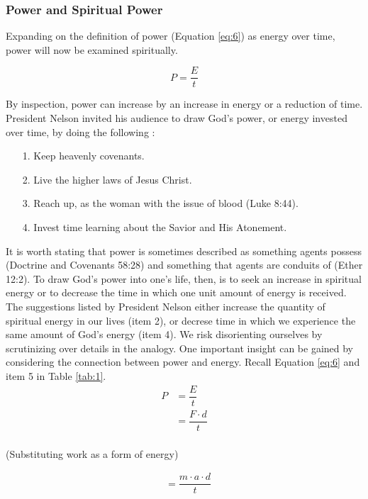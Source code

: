\documentclass{article}
\begin{document}
            \subsubsection{Power and Spiritual Power}
                Expanding on the definition of power (Equation \ref{eq:6}) as energy over time, power will now be examined spiritually.
                
                \[P = \dfrac{E}{t}\]

                By inspection, power can increase by an increase in energy or a reduction of time. President Nelson invited his audience to draw God's power, or energy invested over time, by doing the following \cite{Nelson2}:

                \begin{enumerate}
                    \item[1.] Keep heavenly covenants.
                    \item[2.] Live the higher laws of Jesus Christ.
                    \item[3.] Reach up, as the woman with the issue of blood (Luke 8:44).
                    \item[4.] Invest time learning about the Savior and His Atonement.
                \end{enumerate}

                It is worth stating that power is sometimes described as something agents possess (Doctrine and Covenants 58:28) and something that agents are conduits of (Ether 12:2). 
                To draw God's power into one's life, then, is to seek an increase in spiritual energy or to decrease the time in which one unit amount of energy is received. 
                The suggestions listed by President Nelson either increase the quantity of spiritual energy in our lives (item 2), or decrese time in which we experience the same amount of God's energy (item 4).
                We risk disorienting ourselves by scrutinizing over details in the analogy. One important insight can be gained by considering the connection between power and energy.
                Recall Equation \ref{eq:6} and item 5 in Table \ref{tab:1}.
                \begin{equation}
                    \begin{split}
                        P & = \dfrac{E}{t}\\
                        & = \dfrac{F \cdot d}{t}\\
                    \end{split}
                \end{equation}
                \begin{center}
                    (Substituting work as a form of energy)
                \end{center}
                \begin{equation}
                    \begin{split}
                        & = \dfrac{m \cdot a \cdot d}{t}\\
                    \end{split}
                \end{equation}
                
\end{document}
